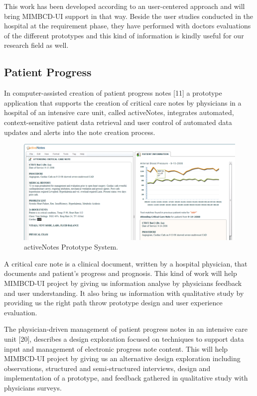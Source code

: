 This work has been developed according to an user-centered approach and will bring MIMBCD-UI support in that way. Beside the user studies conducted in the hospital at the requirement phase, they have performed with doctors evaluations of the different prototypes and this kind of information is kindly useful for our research field as well.

\clearpage

\subsection{Patient Progress}

In computer-assisted creation of patient progress notes [11] a prototype application that supports the creation of critical care notes by physicians in a hospital of an intensive care unit, called activeNotes, integrates automated, context-sensitive patient data retrieval and user control of automated data updates and alerts into the note creation process.

\begin{figure}[!hbt]
\centering
\includegraphics[width=1.00\textwidth]{activenotes.png}
\caption{\label{fig:activenotes}activeNotes Prototype System.
}
\end{figure}

A critical care note is a clinical document, written by a hospital physician, that documents and patient's progress and prognosis. This kind of work will help MIMBCD-UI project by giving us information analyse by physicians feedback and user understanding. It also bring us information with qualitative study by providing us the right path throw prototype design and user experience evaluation.

The physician-driven management of patient progress notes in an intensive care unit [20], describes a design exploration focused on techniques to support data input and management of electronic progress note content. This will help MIMBCD-UI project by giving us an alternative design exploration including observations, structured and semi-structured interviews, design and implementation of a prototype, and feedback gathered in qualitative study with physicians surveys.

